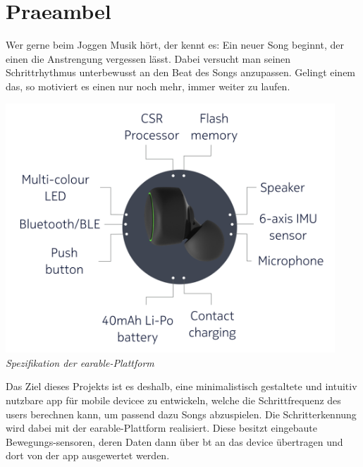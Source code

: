 \documentclass[../pflichtenheft.tex]{subfiles}
\begin{document}
\maketitle
\tableofcontents

\clearpage

\section{Praeambel}
	Wer gerne beim Joggen Musik hört, der kennt es: Ein neuer Song beginnt, der einen die Anstrengung vergessen lässt. Dabei versucht man seinen Schrittrhythmus unterbewusst an den Beat des Songs anzupassen. Gelingt einem das, so motiviert es einen nur noch mehr, immer weiter zu laufen.

	\begin{center}
		\includegraphics[page=1,width=350pt,keepaspectratio]{../graphics/Praeambel/esense.png}
		\textit{Spezifikation der \Gls{earable}-Plattform }
	\end{center}

	Das Ziel dieses Projekts ist es deshalb, eine minimalistisch gestaltete und intuitiv nutzbare \Gls{app} für mobile \Gls{device}e zu entwickeln, welche die Schrittfrequenz des \Gls{user}s berechnen kann, um passend dazu Songs abzuspielen.
	Die Schritterkennung wird dabei mit der \Gls{earable}-Plattform  realisiert. Diese besitzt eingebaute Bewegungs-\Gls{sensor}en, deren Daten dann über \Gls{bt} an das \Gls{device} übertragen und dort von der \Gls{app} ausgewertet werden.
\end{document}
